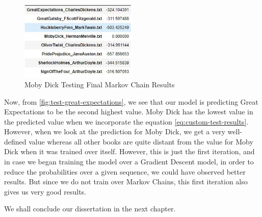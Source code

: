 \begin{figure}[H]
	\begin{center}
		\includegraphics[width = 0.5\textwidth]{Images/testing_mobydick.JPG} %
		\caption{Moby Dick Testing Final Markov Chain Results}
		\label{fig:test-moby-dick}
	\end{center}
\end{figure}

Now, from \ref{fig:test-great-expectations}, we see that our model is predicting Great Expectations to be the second highest value. Moby Dick has the lowest value in the predicted value when we incorporate the equation \ref{eq:custom-test-results}. However, when we look at the prediction for Moby Dick, we get a very well-defined value whereas all other books are quite distant from the value for Moby Dick when it was trained over itself. However, this is just the first iteration, and in case we began training the model over a Gradient Descent model, in order to reduce the probabilities over a given sequence, we could have observed better results. But since we do not train over Markov Chains, this first iteration also gives us very good results.

We shall conclude our dissertation in the next chapter.

